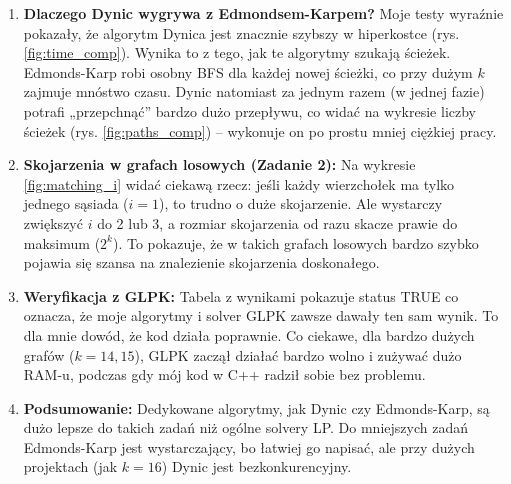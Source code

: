 \documentclass[11pt, a4paper]{article}
\begin{document}
	\begin{enumerate}
		\item \textbf{Dlaczego Dynic wygrywa z Edmondsem-Karpem?} 
		Moje testy wyraźnie pokazały, że algorytm Dynica jest znacznie szybszy w hiperkostce (rys. \ref{fig:time_comp}). Wynika to z tego, jak te algorytmy szukają ścieżek. Edmonds-Karp robi osobny BFS dla każdej nowej ścieżki, co przy dużym $k$ zajmuje mnóstwo czasu. Dynic natomiast za jednym razem (w jednej fazie) potrafi „przepchnąć” bardzo dużo przepływu, co widać na wykresie liczby ścieżek (rys. \ref{fig:paths_comp}) – wykonuje on po prostu mniej ciężkiej pracy.
		
		\item \textbf{Skojarzenia w grafach losowych (Zadanie 2):} 
		Na wykresie \ref{fig:matching_i} widać ciekawą rzecz: jeśli każdy wierzchołek ma tylko jednego sąsiada ($i=1$), to trudno o duże skojarzenie. Ale wystarczy zwiększyć $i$ do 2 lub 3, a rozmiar skojarzenia od razu skacze prawie do maksimum ($2^k$). To pokazuje, że w takich grafach losowych bardzo szybko pojawia się szansa na znalezienie skojarzenia doskonałego.
		
		\item \textbf{Weryfikacja z GLPK:} 
		Tabela z wynikami pokazuje status TRUE co oznacza, że moje algorytmy i solver GLPK zawsze dawały ten sam wynik. To dla mnie dowód, że kod działa poprawnie. Co ciekawe, dla bardzo dużych grafów ($k=14, 15$), GLPK zaczął działać bardzo wolno i zużywać dużo RAM-u, podczas gdy mój kod w C++ radził sobie bez problemu.
		
		\item \textbf{Podsumowanie:} 
		Dedykowane algorytmy, jak Dynic czy Edmonds-Karp, są dużo lepsze do takich zadań niż ogólne solvery LP. Do mniejszych zadań Edmonds-Karp jest wystarczający, bo łatwiej go napisać, ale przy dużych projektach (jak $k=16$) Dynic jest bezkonkurencyjny.
	\end{enumerate}
	
	\clearpage
	
\end{document}
